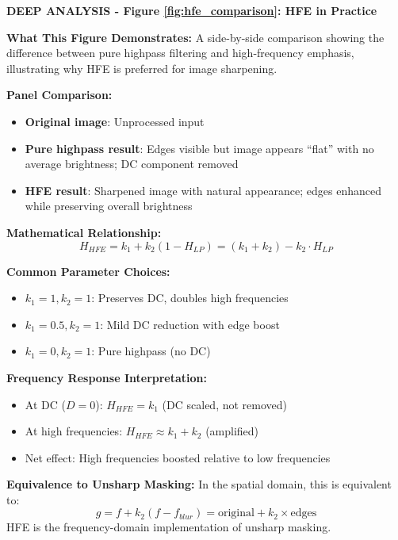 \documentclass[12pt,a4paper]{article}
\begin{document}
\begin{deepexplanation}
\textbf{DEEP ANALYSIS - Figure \ref{fig:hfe_comparison}: HFE in Practice}

\textbf{What This Figure Demonstrates:}
A side-by-side comparison showing the difference between pure highpass filtering and high-frequency emphasis, illustrating why HFE is preferred for image sharpening.

\textbf{Panel Comparison:}
\begin{itemize}
    \item \textbf{Original image}: Unprocessed input
    \item \textbf{Pure highpass result}: Edges visible but image appears ``flat'' with no average brightness; DC component removed
    \item \textbf{HFE result}: Sharpened image with natural appearance; edges enhanced while preserving overall brightness
\end{itemize}

\textbf{Mathematical Relationship:}
\[
H_{HFE} = k_1 + k_2(1 - H_{LP}) = (k_1 + k_2) - k_2 \cdot H_{LP}
\]

\textbf{Common Parameter Choices:}
\begin{itemize}
    \item $k_1 = 1, k_2 = 1$: Preserves DC, doubles high frequencies
    \item $k_1 = 0.5, k_2 = 1$: Mild DC reduction with edge boost
    \item $k_1 = 0, k_2 = 1$: Pure highpass (no DC)
\end{itemize}

\textbf{Frequency Response Interpretation:}
\begin{itemize}
    \item At DC ($D = 0$): $H_{HFE} = k_1$ (DC scaled, not removed)
    \item At high frequencies: $H_{HFE} \approx k_1 + k_2$ (amplified)
    \item Net effect: High frequencies boosted relative to low frequencies
\end{itemize}

\textbf{Equivalence to Unsharp Masking:}
In the spatial domain, this is equivalent to:
\[
g = f + k_2(f - f_{blur}) = \text{original} + k_2 \times \text{edges}
\]
HFE is the frequency-domain implementation of unsharp masking.
\end{deepexplanation}

\end{document}
